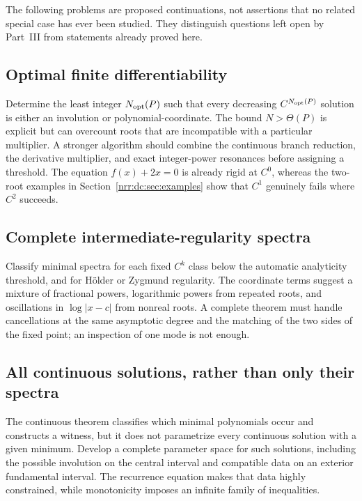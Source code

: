 \documentclass[11pt,letterpaper]{article}
\theoremstyle{definition}
\theoremstyle{remark}
\begin{document}
The following problems are proposed continuations, not assertions that
no related special case has ever been studied. They distinguish
questions left open by Part~III from statements already proved here.

\subsection{Optimal finite differentiability}

Determine the least integer $N_{\rm opt}(P)$ such that every decreasing
$C^{N_{\rm opt}(P)}$ solution is either an involution or polynomial-coordinate.
The bound $N>\Theta(P)$ is explicit but can overcount roots that are
incompatible with a particular multiplier. A stronger algorithm should
combine the continuous branch reduction, the derivative multiplier,
and exact integer-power resonances before assigning a threshold.
The equation $f(x)+2x=0$ is already rigid at
$C^0$, whereas the two-root examples in Section~\ref{nrr:dc:sec:examples}
show that $C^1$ genuinely fails where $C^2$ succeeds.

\subsection{Complete intermediate-regularity spectra}

Classify minimal spectra for each fixed $C^k$ class below the automatic
analyticity threshold, and for H\"older or Zygmund regularity. The
coordinate terms suggest a mixture of fractional powers, logarithmic
powers from repeated roots, and oscillations in $\log|x-c|$ from
nonreal roots. A complete theorem must handle cancellations at the
same asymptotic degree and the matching of the two sides of the fixed
point; an inspection of one mode is not enough.

\subsection{All continuous solutions, rather than only their spectra}

The continuous theorem classifies which minimal polynomials occur
and constructs a witness, but it does not parametrize every continuous
solution with a given minimum. Develop a complete parameter space for
such solutions, including the possible involution on the central
interval and compatible data on an exterior fundamental interval.
The recurrence equation makes that data highly constrained, while
monotonicity imposes an infinite family of inequalities.
\end{document}
